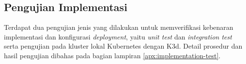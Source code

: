 \subsection{Pengujian Implementasi}

Terdapat dua pengujian jenis yang dilakukan untuk memverifikasi kebenaran implementasi dan konfigurasi \textit{deployment}, yaitu \textit{unit test} dan \textit{integration test} serta pengujian pada kluster lokal Kubernetes dengan K3d. Detail prosedur dan hasil pengujian dibahas pada bagian lampiran \ref{apx:implementation-test}.
